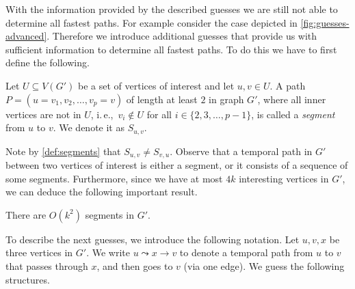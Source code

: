 \documentclass[a4paper,UKenglish,cleveref, autoref, thm-restate]{lipics-v2021}
\newcommand{\ie}{i.\,e.,\ }
\begin{document}
With the information provided by the described guesses we are still not able to determine all fastest paths. For example consider the case depicted in \cref{fig:guesses-advanced}. 
Therefore we introduce additional guesses that provide us with sufficient information to determine all fastest paths. To do this we have to first define the following.
\begin{definition}\label{def:segments}
	Let $U \subseteq V(G')$ be a set of vertices of interest and let $u,v \in U$.
	A path $P = (u=v_1,v_2, \dots, v_p = v)$ of length at least $2$ in graph $G'$, where all inner vertices are not in $U$, \ie $v_i \notin U$ for all $i \in \{ 2, 3, \dots, p-1\}$,
	is called a \emph{segment} from $u$ to $v$. We denote it as $S_{u,v}$.
\end{definition}
Note by \cref{def:segments} that $S_{u,v} \neq S_{v,u}$. 
Observe that a temporal path in $G'$ between two vertices of interest is either a segment, or it consists of a sequence of some segments. Furthermore, since we have at most $4k$ interesting vertices in $G'$, we can deduce the following important result.
\begin{corollary}\label{obs:FPT-k2segments}
	There are $O(k^2)$ segments in $G'$.
\end{corollary}
To describe the next guesses, we introduce the following notation. Let $u,v,x$ be three vertices in $G'$. We write $u \leadsto x \rightarrow v$ to denote a temporal path from $u$ to $v$ that passes through $x$, and then goes to $v$ (via one edge).
We guess the following structures.
\end{document}
